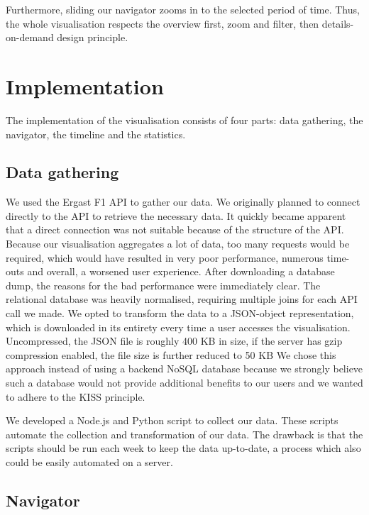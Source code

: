 \documentclass{sigchi}
\begin{document}
Furthermore, sliding our navigator zooms in to the selected period of time. Thus, the whole visualisation respects the overview first, zoom and filter, then details-on-demand design principle\cite{shneiderman1996eyes}.



\section{Implementation} 

The implementation of the visualisation consists of four parts: data gathering, the navigator, the timeline and the statistics.


\subsection{Data gathering} 

\label{gathering}
We used the Ergast F1 API to gather our data. We originally planned to connect directly to the API to retrieve the necessary data. It quickly became apparent that a direct connection was not suitable because of the structure of the API. Because our visualisation aggregates a lot of data, too many requests would be required, which would have resulted in very poor performance, numerous time-outs and overall, a worsened user experience. After downloading a database dump, the reasons for the bad performance were immediately clear. The relational database was heavily normalised, requiring multiple joins for each API call we made. We opted to transform the data to a JSON-object representation, which is downloaded in its entirety every time a user accesses the visualisation. Uncompressed, the JSON file is roughly 400 KB in size, if the server has gzip compression enabled, the file size is further reduced to 50 KB We chose this approach instead of using a backend NoSQL database because we strongly believe such a database would not provide additional benefits to our users and we wanted to adhere to the KISS principle.

We developed a Node.js and Python script to collect our data. These scripts automate the collection and transformation of our data. The drawback is that the scripts should be run each week to keep the data up-to-date, a process which also could be easily automated on a server.



\subsection{Navigator} 
\end{document}
